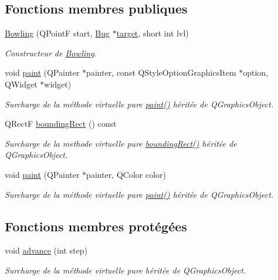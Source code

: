 \subsection*{Fonctions membres publiques}
\begin{DoxyCompactItemize}
\item 
\hyperlink{classBowling_aedb6a5ea36ab23e7a559ab437a5ce64a}{Bowling} (QPointF start, \hyperlink{classBug}{Bug} $\ast$\hyperlink{classProjectile_ae5273bd2c6550b94f38310b69859b093}{target}, short int lvl)
\begin{DoxyCompactList}\small\item\em Constructeur de \hyperlink{classBowling}{Bowling}. \end{DoxyCompactList}\item 
void \hyperlink{classBowling_aff2371151330a42f1e9cd48e545d3239}{paint} (QPainter $\ast$painter, const QStyleOptionGraphicsItem $\ast$option, QWidget $\ast$widget)
\begin{DoxyCompactList}\small\item\em Surcharge de la méthode virtuelle pure \hyperlink{classBowling_aff2371151330a42f1e9cd48e545d3239}{paint()} héritée de QGraphicsObject. \end{DoxyCompactList}\item 
QRectF \hyperlink{classProjectile_a0e0b18909c9c154404384707c6515802}{boundingRect} () const 
\begin{DoxyCompactList}\small\item\em Surcharge de la methode virtuelle pure \hyperlink{classProjectile_a0e0b18909c9c154404384707c6515802}{boundingRect()} héritée de QGraphicsObject. \end{DoxyCompactList}\item 
void \hyperlink{classProjectile_aef0d6ffcea7620988cf5446d0c1133fa}{paint} (QPainter $\ast$painter, QColor color)
\begin{DoxyCompactList}\small\item\em Surcharge de la méthode virtuelle pure \hyperlink{classProjectile_aef0d6ffcea7620988cf5446d0c1133fa}{paint()} héritée de QGraphicsObject. \end{DoxyCompactList}\end{DoxyCompactItemize}
\subsection*{Fonctions membres protégées}
\begin{DoxyCompactItemize}
\item 
void \hyperlink{classProjectile_a8e3b4bae49558a0febfce8c1accea72d}{advance} (int step)
\begin{DoxyCompactList}\small\item\em Surcharge de la méthode virtuelle pure héritée de QGraphicsObject. \end{DoxyCompactList}\end{DoxyCompactItemize}


